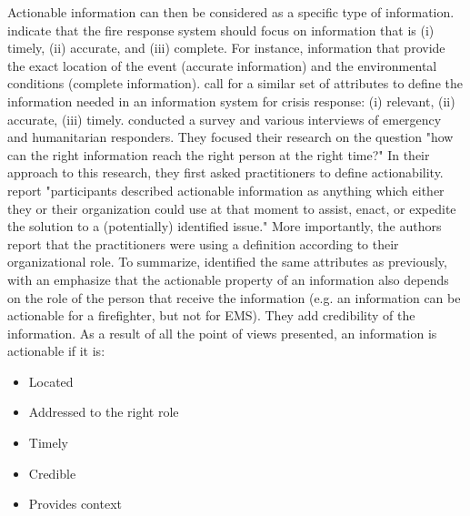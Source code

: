 Actionable information can then be considered as a specific type of information.
\textcite{yangDesignPrinciplesIntegrated2012} indicate that the fire response system should focus on information that is (i) timely, (ii) accurate, and (iii) complete.
For instance, information that provide the exact location of the event (accurate information) and the environmental conditions (complete information).
\textcite{comesBringingStructureDisaster2015} call for a similar set of attributes to define the information needed in an information system for crisis response: (i) relevant, (ii) accurate, (iii) timely.
\textcite{zadeSituationalAwarenessActionability2018} conducted a survey and various interviews of emergency and humanitarian responders.
They focused their research on the question "how can the right information reach the right person at the right time?"
In their approach to this research, they first asked practitioners to define actionability.
\textcite{zadeSituationalAwarenessActionability2018} report "participants described actionable
information as anything which either they or their organization could use at that moment to assist,
enact, or expedite the solution to a (potentially) identified issue."
More importantly, the authors report that the practitioners were using a definition according to their organizational role.
To summarize, \citeauthor{zadeSituationalAwarenessActionability2018} identified the same
attributes as previously, with an emphasize that the actionable property of an information
also depends on the role of the person that receive the information (e.g. an information
can be actionable for a firefighter, but not for EMS).
They add credibility of the information.
As a result of all the point of views presented, an information is actionable if it is:

\begin{itemize}
    \item Located
    \item Addressed to the right role
    \item Timely
    \item Credible
    \item Provides context
\end{itemize}

